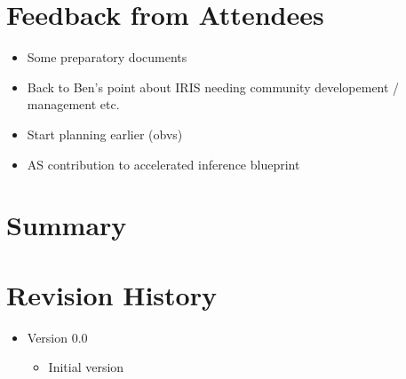 \documentclass[11pt,letterpaper,fleqn]{article}
\begin{document}
\section{Feedback from Attendees}
\begin{itemize}
  \item Some preparatory documents
  \item Back to Ben’s point about IRIS needing community developement / management etc.
  \item Start planning earlier (obvs)
  \item AS contribution to accelerated inference blueprint
\end{itemize}

\section{Summary}
\blindtext[2]

\appendix
\newpage
\section{Revision History}

\vspace{8pt}
\begin{itemize}
  \item Version 0.0
  \vspace{-5pt}
  \begin{itemize}
    \item Initial version
  \end{itemize}
\end{itemize}
\end{document}
